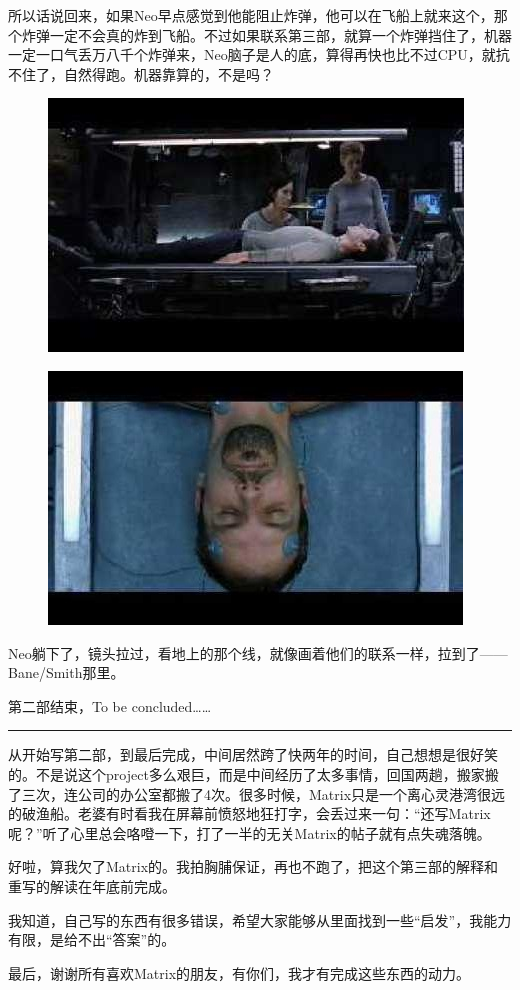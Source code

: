 \documentclass{ctexart}
\newcommand{\myparsep}{\noindent \rule[0.5ex]{\linewidth}{1pt}}
\begin{document}
所以话说回来，如果Neo早点感觉到他能阻止炸弹，他可以在飞船上就来这个，那个炸弹一定不会真的炸到飞船。不过如果联系第三部，就算一个炸弹挡住了，机器一定一口气丢万八千个炸弹来，Neo脑子是人的底，算得再快也比不过CPU，就抗不住了，自然得跑。机器靠算的，不是吗？

\begin{figure}[htb]
\centering
\includegraphics[width=0.5\linewidth]{fig/read_reloaded-178}
\end{figure}

\begin{figure}[htb]
\centering
\includegraphics[width=0.5\linewidth]{fig/read_reloaded-178-1}
\end{figure}

Neo躺下了，镜头拉过，看地上的那个线，就像画着他们的联系一样，拉到了——Bane/Smith那里。

第二部结束，To be concluded……

\myparsep

从开始写第二部，到最后完成，中间居然跨了快两年的时间，自己想想是很好笑的。不是说这个project多么艰巨，而是中间经历了太多事情，回国两趟，搬家搬了三次，连公司的办公室都搬了4次。很多时候，Matrix只是一个离心灵港湾很远的破渔船。老婆有时看我在屏幕前愤怒地狂打字，会丢过来一句：“还写Matrix呢？”听了心里总会咯噔一下，打了一半的无关Matrix的帖子就有点失魂落魄。

好啦，算我欠了Matrix的。我拍胸脯保证，再也不跑了，把这个第三部的解释和重写的解读在年底前完成。

我知道，自己写的东西有很多错误，希望大家能够从里面找到一些“启发”，我能力有限，是给不出“答案”的。

最后，谢谢所有喜欢Matrix的朋友，有你们，我才有完成这些东西的动力。
\end{document}
